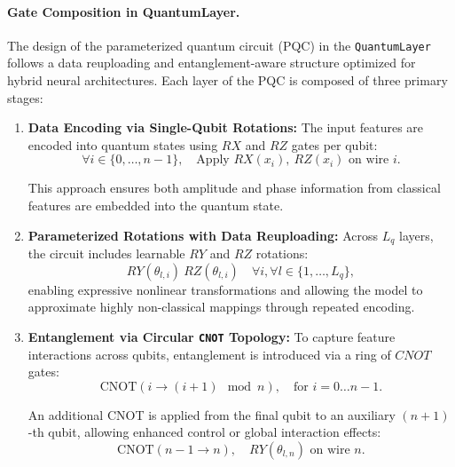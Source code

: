 \documentclass[conference]{IEEEtran}
\begin{document}
\paragraph{Gate Composition in QuantumLayer.}

The design of the parameterized quantum circuit (PQC) in the \texttt{QuantumLayer} follows a data reuploading and entanglement-aware structure optimized for hybrid neural architectures. Each layer of the PQC is composed of three primary stages:

\begin{enumerate}
    \item \textbf{Data Encoding via Single-Qubit Rotations:} The input features are encoded into quantum states using $RX$ and $RZ$ gates per qubit:
    \begin{equation}
    \forall i \in \{0, \dots, n-1\}, \quad \text{Apply } RX(x_i),\ RZ(x_i) \text{ on wire } i.
    \end{equation}

    This approach ensures both amplitude and phase information from classical features are embedded into the quantum state.

    \item \textbf{Parameterized Rotations with Data Reuploading:} Across $L_q$ layers, the circuit includes learnable $RY$ and $RZ$ rotations:
    \begin{equation}
    RY(\theta_{l, i})\ RZ(\theta_{l, i}) \quad \forall i, \forall l \in \{1, \dots, L_q\},
    \end{equation}
    enabling expressive nonlinear transformations and allowing the model to approximate highly non-classical mappings through repeated encoding.

    \item \textbf{Entanglement via Circular \texttt{CNOT} Topology:} To capture feature interactions across qubits, entanglement is introduced via a ring of $CNOT$ gates:
    \begin{equation}
    \text{CNOT}(i \rightarrow (i+1) \mod n),\quad \text{for } i = 0 \dots n{-}1.
    \end{equation}

    An additional CNOT is applied from the final qubit to an auxiliary $(n+1)$-th qubit, allowing enhanced control or global interaction effects:
    \begin{equation}
    \text{CNOT}(n{-}1 \rightarrow n),\quad RY(\theta_{l, n}) \text{ on wire } n.
    \end{equation}
\end{enumerate}
\end{document}
